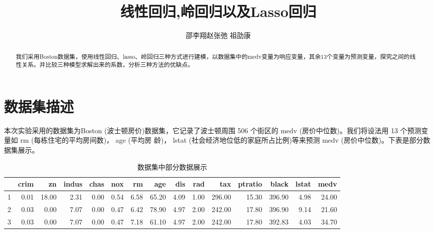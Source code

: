 \documentclass[cn]{elegantpaper}
\author{邵李翔\quad 赵张弛 \quad 祖劭康}
\title{线性回归,岭回归以及Lasso回归}
\date{}
\begin{document}
    
\maketitle
\begin{abstract}
  我们采用Boston数据集，使用线性回归、lasso、岭回归三种方式进行建模，以数据集中的medv变量为响应变量，其余13个变量为预测变量，探究之间的线性关系。并比较三种模型求解出来的系数，分析三种方法的优缺点。
\end{abstract}
\section{数据集描述}
本次实验采用的数据集为Boston (波士顿房价)数据集，它记录了波士顿周围 506 个街区的 medv
(房价中位数)。我们将设法用 13 个预测变量如 rm (每栋住宅的平均房间数)， age (平均房
龄)， lstat (社会经济地位低的家庭所占比例)等来预测 medv (房价中位数)。下表是部分数据集展示。
\begin{table}[ht]
    \centering
    \caption{数据集中部分数据展示}
    \begin{tabular}{rrrrrrrrrrrrrrr}
      \hline
     & crim & zn & indus & chas & nox & rm & age & dis & rad & tax & ptratio & black & lstat & medv \\ 
      \hline
    1 & 0.01 & 18.00 & 2.31 & 0.00 & 0.54 & 6.58 & 65.20 & 4.09 & 1.00 & 296.00 & 15.30 & 396.90 & 4.98 & 24.00 \\ 
      2 & 0.03 & 0.00 & 7.07 & 0.00 & 0.47 & 6.42 & 78.90 & 4.97 & 2.00 & 242.00 & 17.80 & 396.90 & 9.14 & 21.60 \\ 
      3 & 0.03 & 0.00 & 7.07 & 0.00 & 0.47 & 7.18 & 61.10 & 4.97 & 2.00 & 242.00 & 17.80 & 392.83 & 4.03 & 34.70 \\ 
       \hline
    \end{tabular}
\end{table}
\end{document}
